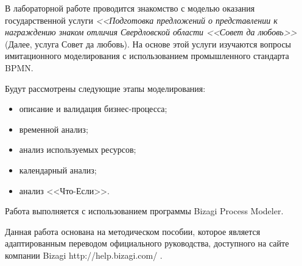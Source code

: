 \Introduction

В лабораторной работе проводится знакомство с моделью оказания
государственной услуги \textit{<<Подготовка предложений о представлении
к награждению знаком отличия Свердловской области <<Совет да любовь>>}
(Далее, услуга Совет да любовь). На основе этой услуги
изучаются вопросы имитационного моделирования с использованием
промышленного стандарта BPMN.

Будут рассмотрены следующие этапы моделирования:

\begin{itemize}
    \item описание и валидация бизнес-процесса;
    \item временной анализ;
    \item анализ используемых ресурсов;
    \item календарный анализ;
    \item анализ <<Что-Если>>.
\end{itemize}

Работа выполняется с использованием программы Bizagi Process
Modeler.

Данная работа основана на методическом пособии, которое является
адаптированным переводом официального руководства,
доступного на сайте компании Bizagi http://help.bizagi.com/ .
